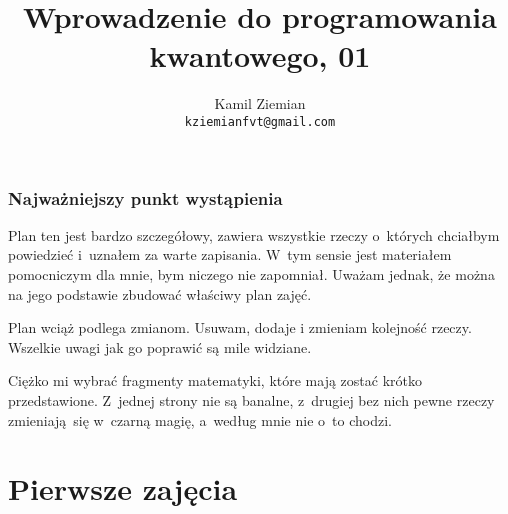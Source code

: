 \documentclass[10pt,t]{beamer}
\title{Wprowadzenie do programowania kwantowego, 01}
\author{Kamil Ziemian \\
 \texttt{kziemianfvt@gmail.com}}
\date{}
\begin{document}






\RaggedRight





\maketitle










\begin{frame}
  \frametitle{Najważniejszy punkt wystąpienia}


  Plan ten jest bardzo szczegółowy, zawiera wszystkie rzeczy o~których
  chciałbym powiedzieć i~uznałem za warte zapisania. W~tym sensie jest
  materiałem pomocniczym dla mnie, bym niczego nie zapomniał. Uważam
  jednak, że można na jego podstawie zbudować właściwy plan zajęć.

  Plan wciąż podlega zmianom. Usuwam, dodaje i zmieniam kolejność
  rzeczy. Wszelkie uwagi jak go poprawić są mile widziane.

  Ciężko mi wybrać fragmenty matematyki, które mają zostać krótko
  przedstawione. Z~jednej strony nie są banalne, z~drugiej bez nich pewne
  rzeczy zmieniają~się w~czarną magię, a~według mnie nie o~to chodzi.

\end{frame}










\section{Pierwsze zajęcia}
\end{document}
